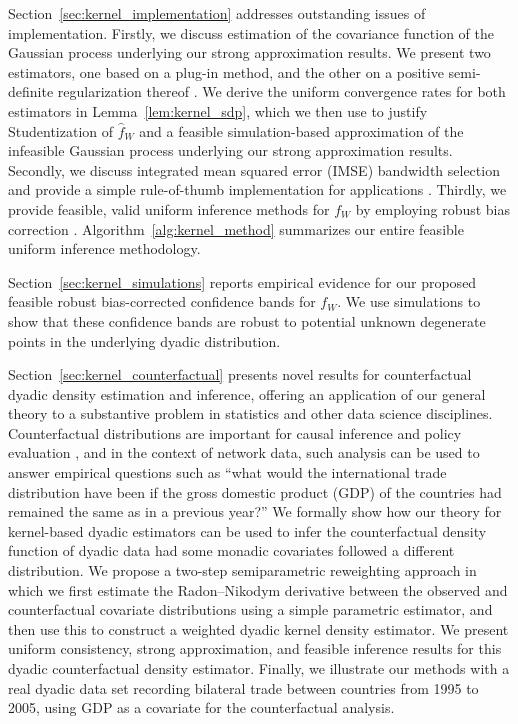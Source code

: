 \documentclass[11pt,lof]{puthesis}
\theoremstyle{break}
\theoremstyle{proof}
\begin{document}
Section~\ref{sec:kernel_implementation} addresses outstanding issues of
implementation. Firstly, we discuss estimation of the covariance function of
the Gaussian process underlying our strong approximation results. We present
two estimators, one based on a plug-in method, and the other on a
positive semi-definite regularization thereof \citep{laurent2005semidefinite}.
We derive the uniform convergence rates for both estimators in
Lemma~\ref{lem:kernel_sdp}, which we then use to justify Studentization
of $\hat{f}_W$
and a feasible simulation-based approximation of the infeasible Gaussian
process underlying our strong approximation results. Secondly, we discuss
integrated mean squared error (IMSE) bandwidth selection and provide a simple
rule-of-thumb implementation for applications
\citep{wand1994kernel,simonoff1996smoothing}. Thirdly, we provide feasible,
valid uniform inference methods for $f_W$ by employing robust bias correction
\citep{calonico2018effect, calonico2022coverage}.
Algorithm~\ref{alg:kernel_method}
summarizes our entire feasible uniform inference methodology.

Section~\ref{sec:kernel_simulations} reports empirical evidence for our proposed
feasible robust bias-corrected confidence bands for $f_W$. We use simulations
to show that these confidence bands are robust to potential unknown degenerate
points in the underlying dyadic distribution.

Section~\ref{sec:kernel_counterfactual} presents novel results for
counterfactual dyadic density estimation and inference, offering an application
of our general theory to a substantive problem in statistics and other data
science disciplines. Counterfactual distributions are important for causal
inference and policy evaluation
\citep{dinardo1996distribution,chernozhukov2013inference}, and in the context
of network data, such analysis can be used to answer empirical questions such
as ``what would the international trade distribution have been if
the gross domestic product (GDP) of the countries had remained the same as in a
previous year?'' We formally show how our theory for kernel-based dyadic
estimators can be used to infer the counterfactual density function of dyadic
data had some monadic covariates followed a different distribution. We propose
a two-step semiparametric reweighting approach in which we first estimate the
Radon--Nikodym derivative between the observed and counterfactual covariate
distributions using a simple parametric estimator, and then use this to
construct a weighted dyadic kernel density estimator. We present uniform
consistency, strong approximation, and feasible inference results for this
dyadic counterfactual density estimator. Finally, we illustrate our
methods with a real dyadic data set recording bilateral trade between
countries from 1995 to 2005, using GDP as a covariate for the
counterfactual analysis.
\end{document}
